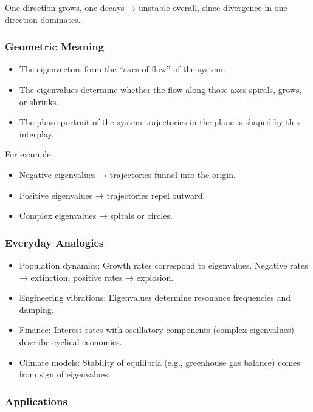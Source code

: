\documentclass[
  letterpaper,
  DIV=11,
  numbers=noendperiod]{scrreprt}
\providecommand{\tightlist}{%
  \setlength{\itemsep}{0pt}\setlength{\parskip}{0pt}}
\begin{document}
One direction grows, one decays → unstable overall, since divergence in
one direction dominates.

\subsubsection{Geometric Meaning}\label{geometric-meaning-17}

\begin{itemize}
\tightlist
\item
  The eigenvectors form the ``axes of flow'' of the system.
\item
  The eigenvalues determine whether the flow along those axes spirals,
  grows, or shrinks.
\item
  The phase portrait of the system-trajectories in the plane-is shaped
  by this interplay.
\end{itemize}

For example:

\begin{itemize}
\tightlist
\item
  Negative eigenvalues → trajectories funnel into the origin.
\item
  Positive eigenvalues → trajectories repel outward.
\item
  Complex eigenvalues → spirals or circles.
\end{itemize}

\subsubsection{Everyday Analogies}\label{everyday-analogies-66}

\begin{itemize}
\tightlist
\item
  Population dynamics: Growth rates correspond to eigenvalues. Negative
  rates → extinction; positive rates → explosion.
\item
  Engineering vibrations: Eigenvalues determine resonance frequencies
  and damping.
\item
  Finance: Interest rates with oscillatory components (complex
  eigenvalues) describe cyclical economies.
\item
  Climate models: Stability of equilibria (e.g., greenhouse gas balance)
  comes from sign of eigenvalues.
\end{itemize}

\subsubsection{Applications}\label{applications-32}
\end{document}
